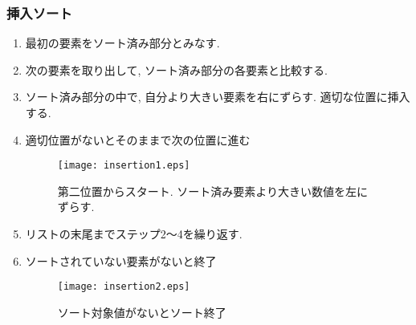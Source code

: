 \documentclass[a4j, 12pt]{jarticle}
\begin{document}
\subsubsection{挿入ソート}
\begin{enumerate}
  \item 最初の要素をソート済み部分とみなす. 
  \item 次の要素を取り出して, ソート済み部分の各要素と比較する. 
  \item ソート済み部分の中で, 自分より大きい要素を右にずらす. 適切な位置に挿入する. 
  \item 適切位置がないとそのままで次の位置に進む
  \begin{figure}[H]
    \centering
    \texttt{[image: insertion1.eps]}
    \caption{第二位置からスタート. ソート済み要素より大きい数値を左にずらす.}
  \end{figure}
  \item リストの末尾までステップ2〜4を繰り返す. 
  \item ソートされていない要素がないと終了
  \begin{figure}[H]
    \centering
    \texttt{[image: insertion2.eps]}
    \caption{ソート対象値がないとソート終了}
  \end{figure}
\end{enumerate}
\end{document}
